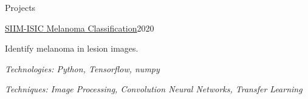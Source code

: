 \documentclass{resume} %
\begin{document}
\begin{rSection}{Projects}
\begin{rSubsection}{\href{https://heshds.me/SIIM_ISIC_melanoma_classification/}{SIIM-ISIC Melanoma Classification}}{2020}{}{}
\item Identify melanoma in lesion images. \item 
\textit{Technologies: Python, Tensorflow, numpy}
\item \textit{Techniques: Image Processing, Convolution Neural Networks, Transfer Learning }
\end{rSubsection}







\end{rSection}
\end{document}
